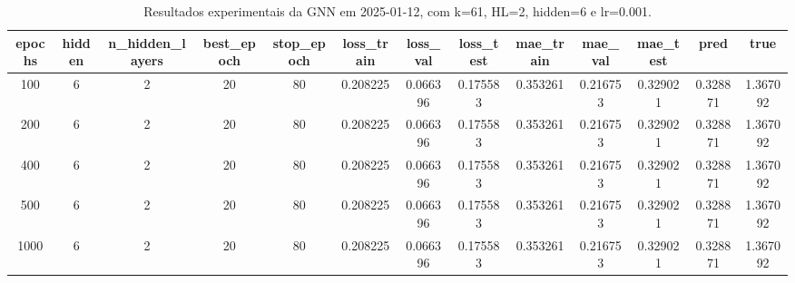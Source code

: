 \begin{table}[h]
\centering
\caption{Resultados experimentais da GNN em 2025-01-12, com k=61, HL=2, hidden=6 e lr=0.001.}
\label{tab:gnn_results_k61_hl2_h6_d20250112}
\begin{tabular}{ccccccccccccc}
\toprule
epochs & hidden & n\_hidden\_layers & best\_epoch & stop\_epoch & loss\_train & loss\_val & loss\_test & mae\_train & mae\_val & mae\_test & pred & true \\
\midrule
100 & 6 & 2 & 20 & 80 & 0.208225 & 0.066396 & 0.175583 & 0.353261 & 0.216753 & 0.329021 & 0.328871 & 1.367092 \\
200 & 6 & 2 & 20 & 80 & 0.208225 & 0.066396 & 0.175583 & 0.353261 & 0.216753 & 0.329021 & 0.328871 & 1.367092 \\
400 & 6 & 2 & 20 & 80 & 0.208225 & 0.066396 & 0.175583 & 0.353261 & 0.216753 & 0.329021 & 0.328871 & 1.367092 \\
500 & 6 & 2 & 20 & 80 & 0.208225 & 0.066396 & 0.175583 & 0.353261 & 0.216753 & 0.329021 & 0.328871 & 1.367092 \\
1000 & 6 & 2 & 20 & 80 & 0.208225 & 0.066396 & 0.175583 & 0.353261 & 0.216753 & 0.329021 & 0.328871 & 1.367092 \\
\bottomrule
\end{tabular}
\end{table}

